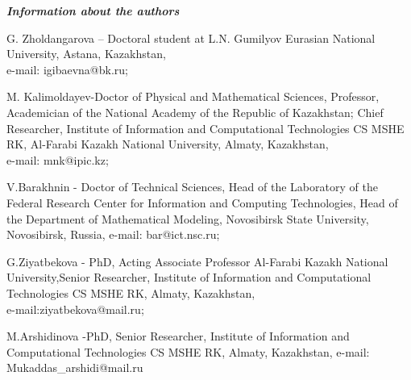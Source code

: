 \emph{{\bfseries Information about the authors}}

\begin{noparindent}

G. Zholdangarova -- Doctoral student at L.N. Gumilyov Eurasian National
University, Astana, Kazakhstan, \\e-mail: igibaevna@bk.ru;

M. Kalimoldayev-Doctor of Physical and Mathematical Sciences, Professor,
Academician of the National Academy of the Republic of Kazakhstan; Chief
Researcher, Institute of Information and Computational Technologies CS
MSHE RK, Al-Farabi Kazakh National University, Almaty, Kazakhstan,
\\e-mail: mnk@ipic.kz;

V.Barakhnin - Doctor of Technical Sciences, Head of the Laboratory of
the Federal Research Center for Information and Computing Technologies,
Head of the Department of Mathematical Modeling, Novosibirsk State
University, Novosibirsk, Russia, e-mail: bar@ict.nsc.ru;

G.Ziyatbekova - PhD, Acting Associate Professor Al-Farabi Kazakh
National University,Senior Researcher, Institute of Information and
Computational Technologies CS MSHE RK, Almaty, Kazakhstan,\\ e-mail:ziyatbekova@mail.ru;

M.Arshidinova -PhD, Senior Researcher, Institute of Information and
Computational Technologies CS MSHE RK, Almaty, Kazakhstan, e-mail:
Mukaddas\_arshidi@mail.ru
\end{noparindent}



